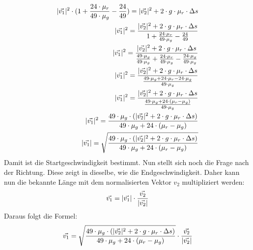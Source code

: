 \begin{align}
    \lvert \vec{v_1} \rvert^2 \cdot (1 + \frac{24 \cdot \mu_r}{49 \cdot \mu_g} - \frac{24}{49}) = \lvert \vec{v_2} \rvert^2 + 2 \cdot g \cdot \mu_r \cdot \Delta s\\
    \lvert \vec{v_1} \rvert^2 = \frac{\lvert \vec{v_2} \rvert^2 + 2 \cdot g \cdot \mu_r \cdot \Delta s}{1 + \frac{24 \cdot \mu_r}{49 \cdot \mu_g} - \frac{24}{49}}\\
    \lvert \vec{v_1} \rvert^2 = \frac{\lvert \vec{v_2} \rvert^2 + 2 \cdot g \cdot \mu_r \cdot \Delta s}{\frac{49 \cdot \mu_g}{49 \cdot \mu_g} + \frac{24 \cdot \mu_r}{49 \cdot \mu_g} - \frac{24 \cdot \mu_g}{49 \cdot \mu_g}}\\
    \lvert \vec{v_1} \rvert^2 = \frac{\lvert \vec{v_2} \rvert^2 + 2 \cdot g \cdot \mu_r \cdot \Delta s}{\frac{49 \cdot \mu_g + 24 \cdot \mu_r - 24 \cdot \mu_g}{49 \cdot \mu_g}}\\
    \lvert \vec{v_1} \rvert^2 = \frac{\lvert \vec{v_2} \rvert^2 + 2 \cdot g \cdot \mu_r \cdot \Delta s}{\frac{49 \cdot \mu_g + 24 \cdot (\mu_r - \mu_g)}{49 \cdot \mu_g}}\\
    \lvert \vec{v_1} \rvert^2 = \frac{49 \cdot \mu_g \cdot (\lvert \vec{v_2} \rvert^2 + 2 \cdot g \cdot \mu_r \cdot \Delta s)}{49 \cdot \mu_g + 24 \cdot (\mu_r - \mu_g)}\\
    \lvert \vec{v_1} \rvert = \sqrt{\frac{49 \cdot \mu_g \cdot (\lvert \vec{v_2} \rvert^2 + 2 \cdot g \cdot \mu_r \cdot \Delta s)}{49 \cdot \mu_g + 24 \cdot (\mu_r - \mu_g)}}
\end{align}
Damit ist die Startgeschwindigkeit bestimmt. Nun stellt sich noch die Frage nach der Richtung. Diese zeigt in dieselbe,
wie die Endgeschwindigkeit. Daher kann nun die bekannte Länge mit dem normalisierten Vektor $v_2$ multipliziert
werden:
\begin{align}
    \vec{v_1} = \lvert \vec{v_1} \rvert \cdot \frac{\vec{v_2}}{\lvert \vec{v_2} \rvert}
\end{align}
Daraus folgt die Formel:
\begin{align}
    \vec{v_1} = \sqrt{\frac{49 \cdot \mu_g \cdot (\lvert \vec{v_2} \rvert^2 + 2 \cdot g \cdot \mu_r \cdot \Delta s)}{49 \cdot \mu_g + 24 \cdot (\mu_r - \mu_g)}} \cdot \frac{\vec{v_2}}{\lvert \vec{v_2} \rvert}
\end{align}
